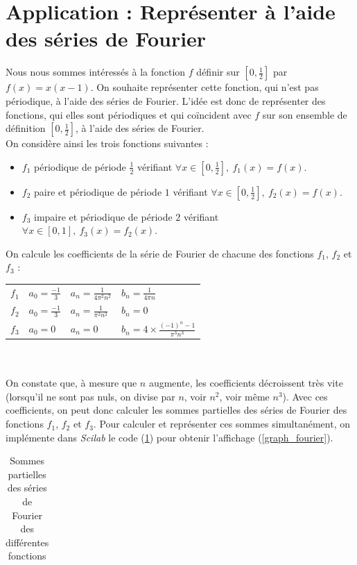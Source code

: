 \documentclass[a4paper,10pt]{report}
\begin{document}
\section{Application : Représenter à l'aide des séries de Fourier}
Nous nous sommes intéressés à la fonction $f$ définir sur $[0,\frac{1}{2}]$ par $f(x)=x(x-1)$. On souhaite représenter cette fonction, qui n'est pas périodique, à l'aide des séries de Fourier. L'idée est donc de représenter des fonctions, qui elles sont périodiques et qui coïncident avec $f$ sur son ensemble de définition $[0,\frac{1}{2}]$, à l'aide des séries de Fourier.\\
On considère ainsi les trois fonctions suivantes :
\begin{itemize}
\item $f_1$ périodique de période $\frac{1}{2}$ vérifiant $\forall x \in [0,\frac{1}{2}], \ f_1(x)=f(x).$
\item $f_2$ paire et périodique de période $1$ vérifiant $\forall x \in [0,\frac{1}{2}], \ f_2(x)=f(x).$
\item $f_3$ impaire et périodique de période $2$ vérifiant $\forall x \in [0,1], \ f_3(x)=f_2(x).$
\end{itemize}
On calcule les coefficients de la série de Fourier de chacune des fonctions $f_1$, $f_2$ et $f_3$ : \\
\begin{tabular}{llll}
$f_1$ & $a_0=\frac{-1}{3}$ & $a_n=\frac{1}{4\pi^2n^2}$ & $b_n=\frac{1}{4\pi n}$ \\
$f_2$ & $a_0=\frac{-1}{3}$ & $a_n=\frac{1}{\pi^2n^2}$ & $b_n=0$ \\
$f_3$ & $a_0=0$ & $a_n=0$ & $b_n=4\times \frac{(-1)^n-1}{\pi^3 n^3}$
\end{tabular} \\ \\
\indent On constate que, à mesure que $n$ augmente, les coefficients décroissent très vite (lorsqu'il ne sont pas nuls, on divise par $n$, voir $n^2$, voir même $n^3$). Avec ces coefficients, on peut donc calculer les sommes partielles des séries de Fourier des fonctions $f_1$, $f_2$ et $f_3$. Pour calculer et représenter ces sommes simultanément, on implémente dans \textit{Scilab} le code (\ref{fourier}) pour obtenir l'affichage (\ref{graph_fourier}).
\begin{table}[H]
\caption{Sommes partielles des séries de Fourier des différentes fonctions}
\begin{tabular}{l}

\label{fourier}
\end{tabular}
\end{table}
\end{document}
